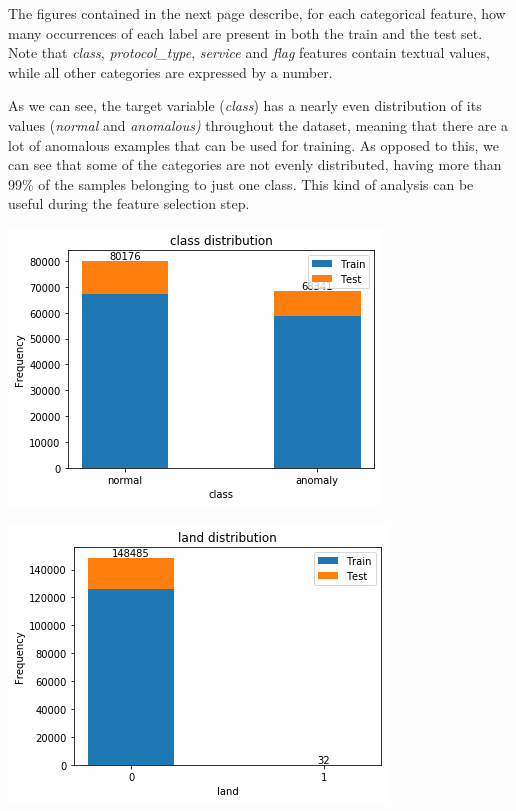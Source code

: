The figures contained in the next page describe, for each categorical feature, how many occurrences of each label are present in both the train and the test set. Note that \textit{class}, \textit{protocol\_type}, \textit{service} and \textit{flag} features contain textual values, while all other categories are expressed by a number.

As we can see, the target variable (\textit{class}) has a nearly even distribution of its values (\textit{normal} and \textit{anomalous)} throughout the dataset, meaning that there are a lot of anomalous examples that can be used for training. As opposed to this, we can see that some of the categories are not evenly distributed, having more than 99\% of the samples belonging to just one class. This kind of analysis can be useful during the feature selection step.


\FloatBarrier

\includegraphics[width=0.9\linewidth]{img/cat6.png}


\includegraphics[width=0.9\linewidth]{img/cat1.png}

